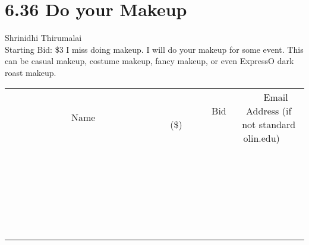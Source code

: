 \documentclass[11pt]{article}
\begin{document}
\section*{6.36 Do your Makeup}
Shrinidhi Thirumalai
\\
Starting Bid: \$3
\newline
I miss doing makeup. I will do your makeup for some event. This can be casual makeup, costume makeup, fancy makeup, or even ExpressO dark roast makeup.
\\[6ex]
\begin{tabular}{c c c}
~~~~~~~~~~~~~Name~~~~~~~~~~~~~ & ~~~~~~~~~Bid (\$)~~~~~~~~~  & ~~~Email Address (if not standard olin.edu)~~~\\
 & & \\
\hline
 & & \\
\hline
 & & \\
\hline
 & & \\
\hline
 & & \\
\hline
 & & \\
\hline
 & & \\
\hline
 & & \\
\hline
 & & \\
\hline
 & & \\
\hline
 & & \\
\hline
 & & \\
\hline
 & & \\
\hline
 & & \\
\hline
 & & \\
\hline
 & & \\
\hline
 & & \\
\hline
 & & \\
\hline
 & & \\
\hline
 & & \\
\hline
 & & \\
\hline
 & & \\
\hline
 & & \\
\hline
 & & \\
\hline
 & & \\
\hline
 & & \\
\hline
\end{tabular}
\newpage
\end{document}
